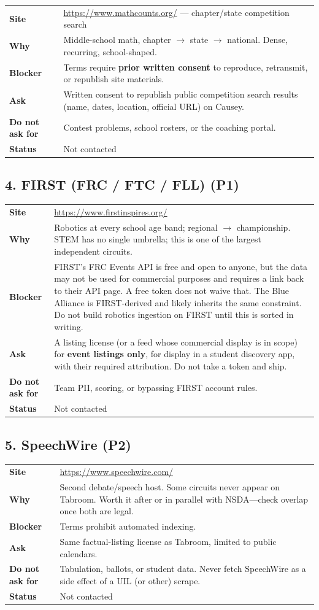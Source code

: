 \documentclass[11pt]{article}
\newcommand{\orgrow}[2]{%
  \textbf{#1} & #2 \\[0.35em]
}
\begin{document}
\begin{tabularx}{\textwidth}{@{}L{2.55cm} Y@{}}
\orgrow{Site}{\url{https://www.mathcounts.org/} --- chapter/state competition search}
\orgrow{Why}{Middle-school math, chapter $\rightarrow$ state $\rightarrow$ national. Dense, recurring, school-shaped.}
\orgrow{Blocker}{Terms require \textbf{prior written consent} to reproduce, retransmit, or republish site materials.}
\orgrow{Ask}{Written consent to republish public competition search results (name, dates, location, official URL) on Causey.}
\orgrow{Do not ask for}{Contest problems, school rosters, or the coaching portal.}
\orgrow{Status}{Not contacted}
\end{tabularx}

\subsection*{4. FIRST (FRC / FTC / FLL) (P1)}

\begin{tabularx}{\textwidth}{@{}L{2.55cm} Y@{}}
\orgrow{Site}{\url{https://www.firstinspires.org/}}
\orgrow{Why}{Robotics at every school age band; regional $\rightarrow$ championship. STEM has no single umbrella; this is one of the largest independent circuits.}
\orgrow{Blocker}{FIRST's FRC Events API is free and open to anyone, but the data may not be used for commercial purposes and requires a link back to their API page. A free token does not waive that. The Blue Alliance is FIRST-derived and likely inherits the same constraint. Do not build robotics ingestion on FIRST until this is sorted in writing.}
\orgrow{Ask}{A listing license (or a feed whose commercial display is in scope) for \textbf{event listings only}, for display in a student discovery app, with their required attribution. Do not take a token and ship.}
\orgrow{Do not ask for}{Team PII, scoring, or bypassing FIRST account rules.}
\orgrow{Status}{Not contacted}
\end{tabularx}

\subsection*{5. SpeechWire (P2)}

\begin{tabularx}{\textwidth}{@{}L{2.55cm} Y@{}}
\orgrow{Site}{\url{https://www.speechwire.com/}}
\orgrow{Why}{Second debate/speech host. Some circuits never appear on Tabroom. Worth it after or in parallel with NSDA---check overlap once both are legal.}
\orgrow{Blocker}{Terms prohibit automated indexing.}
\orgrow{Ask}{Same factual-listing license as Tabroom, limited to public calendars.}
\orgrow{Do not ask for}{Tabulation, ballots, or student data. Never fetch SpeechWire as a side effect of a UIL (or other) scrape.}
\orgrow{Status}{Not contacted}
\end{tabularx}
\end{document}
